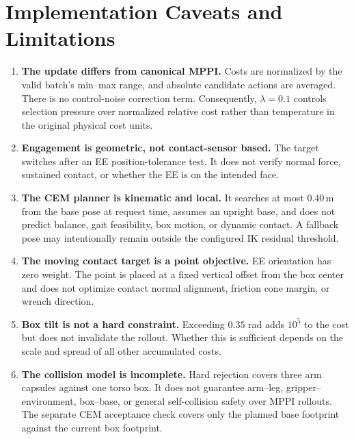 \documentclass[11pt,a4paper]{article}
\begin{document}
\setcounter{section}{11}

\section{Implementation Caveats and Limitations}

\begin{enumerate}
  \item \textbf{The update differs from canonical MPPI.}
  Costs are normalized by the valid batch's min--max range, and absolute
  candidate actions are averaged. There is no control-noise correction term.
  Consequently, $\lambda=0.1$ controls selection pressure over normalized
  relative cost rather than temperature in the original physical cost units.

  \item \textbf{Engagement is geometric, not contact-sensor based.}
  The target switches after an EE position-tolerance test. It does not verify
  normal force, sustained contact, or whether the EE is on the intended face.

  \item \textbf{The CEM planner is kinematic and local.}
  It searches at most $0.40\,\mathrm{m}$ from the base pose at request time,
  assumes an upright base, and does not predict balance, gait feasibility, box
  motion, or dynamic contact. A fallback pose may intentionally remain outside
  the configured IK residual threshold.

  \item \textbf{The moving contact target is a point objective.}
  EE orientation has zero weight. The point is placed at a fixed vertical
  offset from the box center and does not optimize contact normal alignment,
  friction cone margin, or wrench direction.

  \item \textbf{Box tilt is not a hard constraint.}
  Exceeding $0.35$ rad adds $10^5$ to the cost but does not invalidate the
  rollout. Whether this is sufficient depends on the scale and spread of all
  other accumulated costs.

  \item \textbf{The collision model is incomplete.}
  Hard rejection covers three arm capsules against one torso box. It does not
  guarantee arm--leg, gripper--environment, box--base, or general
  self-collision safety over MPPI rollouts. The separate CEM acceptance check
  covers only the planned base footprint against the current box footprint.


\end{enumerate}
\end{document}

